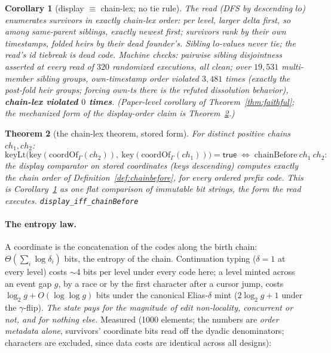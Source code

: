 \documentclass[11pt]{article}
\newtheorem{theorem}{Theorem}[section]
\newtheorem{corollary}[theorem]{Corollary}
\newcommand{\lean}[1]{\texttt{#1}}
\begin{document}
\begin{corollary}[display $\equiv$ chain-lex; no tie rule]
\label{cor:lex}
The read (DFS by descending $lo$) enumerates survivors in exactly
chain-lex order: per level, larger delta first, so among same-parent
siblings, exactly newest first; survivors rank by their own
timestamps, folded heirs by their dead founder's. Sibling $lo$-values
never tie; the read's id tiebreak is dead code. Machine checks:
pairwise sibling disjointness asserted at every read of $320$
randomized executions, all clean; over $19{,}531$ multi-member sibling
groups, own-timestamp order violated $3{,}481$ times (exactly the
post-fold heir groups; forcing own-ts there is the refuted
dissolution behavior), \textbf{chain-lex violated $0$ times}.
(Paper-level corollary of Theorem~\ref{thm:faithful}; the mechanized
form of the display-order claim is Theorem~\ref{thm:chainlex}.)
\end{corollary}

\begin{theorem}[the chain-lex theorem, stored form]
\label{thm:chainlex}
For distinct positive chains $ch_1, ch_2$:
\[
  \mathrm{keyLt}\bigl(\mathrm{key}(\mathrm{coordOf}_\Gamma(ch_2)),\
  \mathrm{key}(\mathrm{coordOf}_\Gamma(ch_1))\bigr) = \mathsf{true}
  \;\iff\; \mathrm{chainBefore}\ ch_1\ ch_2 :
\]
the display comparator on stored coordinates (keys descending)
computes exactly the chain order of
Definition~\ref{def:chainbefore}, for every ordered prefix code.
This is Corollary~\ref{cor:lex} as one flat comparison of immutable
bit strings, the form the read executes.
\hfill\lean{display\_iff\_chainBefore}
\end{theorem}

\paragraph{The entropy law.} A coordinate is the concatenation of the
codes along the birth chain: $\Theta(\sum_i \log \delta_i)$ bits,
the entropy of the chain. Continuation typing ($\delta = 1$ at every
level) costs $\sim$4 bits per level under every code here; a level
minted across an event gap $g$, by a race or by the first character
after a cursor jump, costs $\log_2 g + O(\log \log g)$ bits under
the canonical Elias-$\delta$ mint ($2\log_2 g + 1$ under the
$\gamma$-flip). \emph{The state pays for the magnitude of edit
non-locality, concurrent or not, and for nothing else.} Measured (1000
elements; the numbers are \emph{order metadata alone}, survivors'
coordinate bits read off the dyadic denominators; characters are
excluded, since data costs are identical across all designs):
\end{document}

